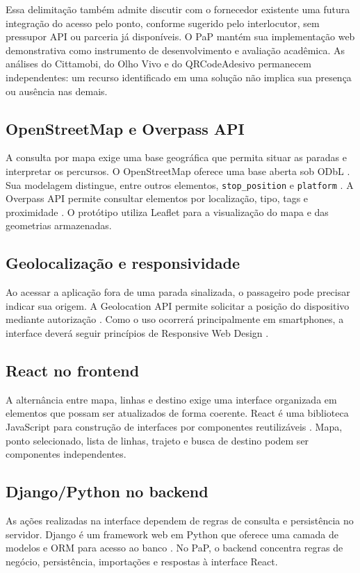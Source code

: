 \documentclass[12pt,oneside,a4paper,brazil]{abntex2}
\begin{document}
Essa delimitação também admite discutir com o fornecedor existente uma futura integração do acesso pelo ponto, conforme sugerido pelo interlocutor, sem pressupor API ou parceria já disponíveis. O PaP mantém sua implementação web demonstrativa como instrumento de desenvolvimento e avaliação acadêmica. As análises do Cittamobi, do Olho Vivo e do QRCodeAdesivo permanecem independentes: um recurso identificado em uma solução não implica sua presença ou ausência nas demais.

\subsection{OpenStreetMap e Overpass API}
A consulta por mapa exige uma base geográfica que permita situar as paradas e interpretar os percursos. O OpenStreetMap oferece uma base aberta sob ODbL \citep{osmlicense}. Sua modelagem distingue, entre outros elementos, \texttt{stop\_position} e \texttt{platform} \citep{osmpt}. A Overpass API permite consultar elementos por localização, tipo, tags e proximidade \citep{overpass}. O protótipo utiliza Leaflet para a visualização do mapa e das geometrias armazenadas.

\subsection{Geolocalização e responsividade}
Ao acessar a aplicação fora de uma parada sinalizada, o passageiro pode precisar indicar sua origem. A Geolocation API permite solicitar a posição do dispositivo mediante autorização \citep{geolocation}. Como o uso ocorrerá principalmente em smartphones, a interface deverá seguir princípios de Responsive Web Design \citep{responsive}.

\subsection{React no frontend}
A alternância entre mapa, linhas e destino exige uma interface organizada em elementos que possam ser atualizados de forma coerente. React é uma biblioteca JavaScript para construção de interfaces por componentes reutilizáveis \citep{react}. Mapa, ponto selecionado, lista de linhas, trajeto e busca de destino podem ser componentes independentes.

\subsection{Django/Python no backend}
As ações realizadas na interface dependem de regras de consulta e persistência no servidor. Django é um framework web em Python que oferece uma camada de modelos e ORM para acesso ao banco \citep{django}. No PaP, o backend concentra regras de negócio, persistência, importações e respostas à interface React.
\end{document}

